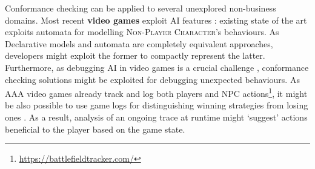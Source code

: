 %
{Conformance checking can be applied to several unexplored non-business domains.} 
   Most recent \textbf{video games}  exploit AI features \cite{LiGT21}: existing state of the art exploits automata \cite{Miyake2017} for modelling \textsc{Non-Player Character}'s behaviours. As Declarative models and automata are completely equivalent approaches, developers might exploit the former to  compactly represent the latter. Furthermore, as debugging AI in video games is a crucial challenge \cite{john2019debugging}, conformance checking solutions might be exploited for debugging unexpected behaviours. As AAA video games already  track and log both players and NPC actions\footnote{\url{https://battlefieldtracker.com/}}, it might be also possible to use game logs for distinguishing winning strategies from losing ones \cite{mining}. As a result, analysis of an ongoing trace at runtime might `suggest'  actions beneficial to the player based on the game state.%

